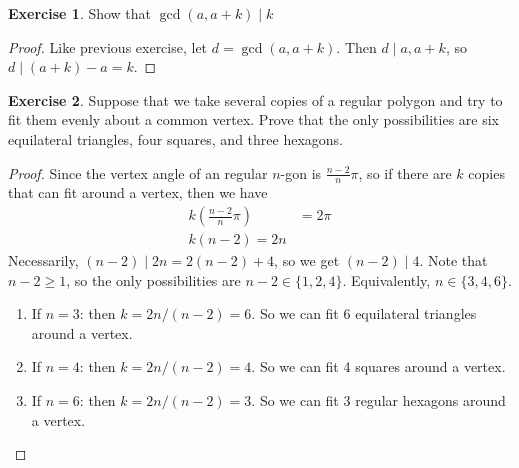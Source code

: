 \documentclass{article}
\theoremstyle{definition}
\newtheorem{exercise}{Exercise}
\begin{document}
\newpage

\begin{exercise}
Show that $\gcd(a, a + k) \mid k$
\end{exercise}
\begin{proof}
Like previous exercise, let $d = \gcd(a, a + k)$. Then $d \mid a, a + k$, so $d \mid (a + k) - a = k$.
\end{proof}

\newpage

\begin{exercise}
Suppose that we take several copies of a regular polygon and try to fit them evenly about a common vertex. Prove that the only possibilities are six equilateral triangles, four squares, and three hexagons.
\end{exercise}
\begin{proof}
Since the vertex angle of an regular $n$-gon is $\frac{n - 2}{n} \pi$, so if there are $k$ copies that can fit around a vertex, then we have
\begin{align*}
k \left( \frac{n - 2}{n} \pi \right) & = 2 \pi \\
k (n - 2) = 2n
\end{align*}
Necessarily, $(n - 2) \mid 2n = 2(n - 2) + 4$, so we get $(n - 2) \mid 4$. Note that $n - 2 \geq 1$, so the only possibilities are $n - 2 \in \{ 1, 2, 4 \}$. Equivalently, $n \in \{ 3, 4, 6 \}$.
\begin{enumerate}
	\item If $n = 3$: then $k = 2n/(n - 2) = 6$. So we can fit 6 equilateral triangles around a vertex.
	\item If $n = 4$: then $k = 2n/(n - 2) = 4$. So we can fit 4 squares around a vertex.
	\item If $n = 6$: then $k = 2n/(n - 2) = 3$. So we can fit 3 regular hexagons around a vertex.
\end{enumerate}
\end{proof}

\newpage
\end{document}
